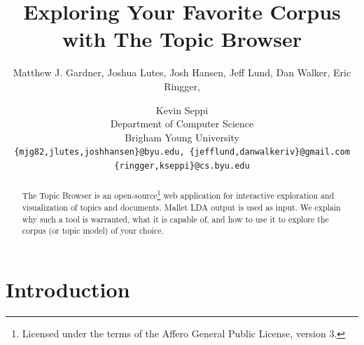 \documentclass[11pt]{article}
\title{Exploring Your Favorite Corpus with The Topic Browser}
\author{Matthew J. Gardner, Joshua Lutes, Josh Hansen, Jeff Lund, Dan Walker, Eric Ringger, \and Kevin Seppi\\
Department of Computer Science\\
Brigham Young University\\
\tt \{mjg82,jlutes,joshhansen\}@byu.edu, \{jefflund,danwalkeriv\}@gmail.com\\
\tt \{ringger,kseppi\}@cs.byu.edu}
\date{}
\begin{document}
\maketitle


\begin{abstract}
The Topic Browser is an open-source\footnote{Licensed under the terms of the
Affero General Public License, version 3.}  web application for interactive
exploration and visualization of topics and documents. Mallet LDA output is used
as input. We explain why such a tool is warranted, what it is capable of, and
how to use it to explore the corpus (or topic model) of your choice.
\end{abstract}

\section{Introduction}
% 
% 
\end{document}
